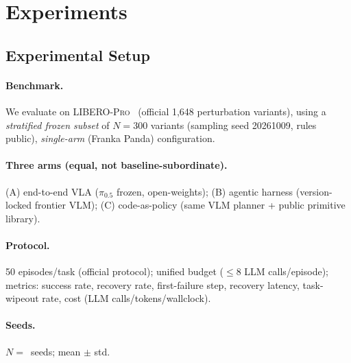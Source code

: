 
\section{Experiments}
\label{sec:exp}

\subsection{Experimental Setup}
\paragraph{Benchmark.} We evaluate on \textsc{LIBERO-Pro}~\cite{liberopro2025}
(official 1{,}648 perturbation variants), using a \emph{stratified frozen subset}
of $N{=}300$ variants (sampling seed 20261009, rules public), \emph{single-arm}
(Franka Panda) configuration. %
\paragraph{Three arms (equal, not baseline-subordinate).}
(A) end-to-end VLA ($\pi_{0.5}$ frozen, open-weights);
(B) agentic harness (version-locked frontier VLM);
(C) code-as-policy (same VLM planner + public primitive library).
\paragraph{Protocol.} 50 episodes/task (official protocol); unified budget
($\leq$8 LLM calls/episode); metrics: success rate, recovery rate, first-failure
step, recovery latency, task-wipeout rate, cost (LLM calls/tokens/wallclock).
\paragraph{Seeds.} $N{=}\,$ seeds; mean $\pm$ std.


